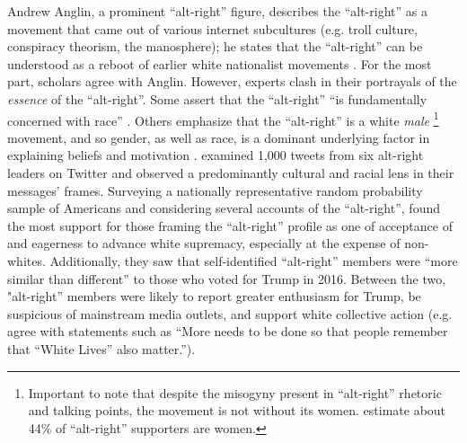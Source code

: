 \documentclass[acmlarge, screen, authorversion]{acmart}
\begin{document}
Andrew Anglin, a prominent “alt-right” figure, describes the “alt-right”
as a movement that came out of various internet subcultures (e.g. troll
culture, conspiracy theorism, the manosphere); he states that the “alt-right” can be understood as a reboot of earlier
white nationalist movements \cite{andrewanglinNormieGuideAltRight}. For the most part, scholars agree with Anglin.
However, experts clash in their portrayals of the \textit{essence} of the ``alt-right''\cite{forscherPsychologicalProfileAltRight2020}. Some assert that the “alt-right” “is fundamentally concerned
with race” \cite{hawleyMakingSenseAltright2017}. Others emphasize that the ``alt-right” is a white
\textit{male} \footnote{Important to note that despite the misogyny present in
	“alt-right” rhetoric and talking points, the movement is not without its
	women. \citet{forscherPsychologicalProfileAltRight2020} estimate about 44\% of “alt-right”
supporters are women.}
movement, and so gender, as well as race, is a dominant underlying
factor in explaining beliefs and motivation \cite{kuszWinningBiglySporting2019}. \citet{gallaherMainstreamingWhiteSupremacy2020}
examined 1,000 tweets from six alt-right leaders on Twitter and observed
a predominantly cultural and racial lens in their messages’ frames.
Surveying a nationally representative random probability sample of
Americans and considering several accounts of the “alt-right”,
\citet{forscherPsychologicalProfileAltRight2020} found the most support for those framing
the “alt-right” profile as one of acceptance of and eagerness to advance
white supremacy, especially at the expense of non-whites. Additionally,
they saw that self-identified “alt-right” members were “more similar
than different” to those who voted for Trump in 2016. Between the two, "alt-right” members were likely to
report greater enthusiasm for Trump, be suspicious of mainstream
media outlets, and support white collective action (e.g. agree with
statements such as ``More needs to be done so that people remember
that ``White Lives'' also matter.'').
\end{document}
